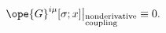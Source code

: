 \begin{equation}	\label{12.44}
\ope{G}^{i\mu}[\sigma;x]\big
|_{\begin{subarray}{l}\text{nonderivative}\\ \text{coupling} \end{subarray} }
\equiv 0.
	\end{equation}

